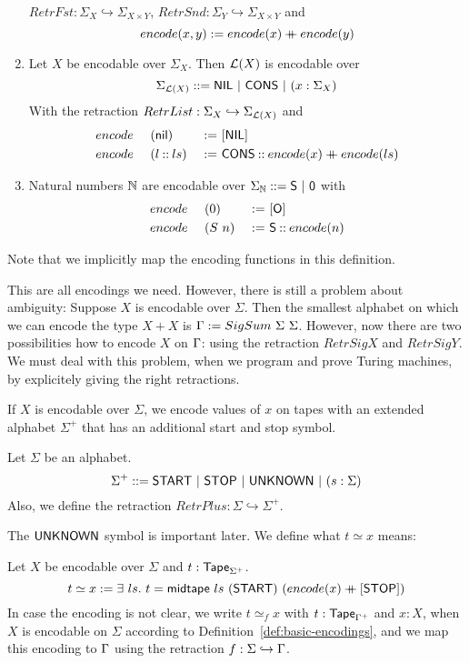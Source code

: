 \begin{definition}
\begin{enumerate}
    $RetrFst : \Sigma_X \hookrightarrow \Sigma_{X \times Y}$, $RetrSnd : \Sigma_Y \hookrightarrow \Sigma_{X \times Y}$ and
    \[
      encode(x,y) := encode(x) \mathbin{+\mkern-10mu+} encode(y)
    \]
  \item Let $X$ be encodable over $\Sigma_X$.  Then $\mathcal{L}(X)$ is encodable over
    \[ \Sigma_{\mathcal{L}(X)} ::= \mathsf{NIL} ~|~ \mathsf{CONS} ~|~ (x:\Sigma_X) \]
    With the retraction $RetrList : \Sigma_X \hookrightarrow \Sigma_{\mathcal{L}(X)}$ and
    \begin{alignat*}{3}
      &encode~&&(\mathsf{nil}      ) &~:=~& [\mathsf{NIL}] \\
      &encode~&&(l \mathbin{::} ls) &~:=~& \mathsf{CONS} \mathbin{::} encode(x) \mathbin{+\mkern-10mu+} encode(ls)
    \end{alignat*}
  \item Natural numbers $\mathbb{N}$ are encodable over $\Sigma_{\mathbb{N}} ::= \mathsf{S} ~|~ \mathsf{0} $ with
    \begin{alignat*}{3}
      &encode~&&(0  ) &~:=~& [\mathsf{O}] \\
      &encode~&&(S~n) &~:=~& \mathsf{S} \mathbin{::} encode(n)
    \end{alignat*}
  \end{enumerate}
  Note that we implicitly map the encoding functions in this definition.
\end{definition}

This are all encodings we need.  However, there is still a problem about ambiguity: Suppose $X$ is encodable over $\Sigma$.  Then the smallest
alphabet on which we can encode the type $X+X$ is $\Gamma := SigSum~\Sigma~\Sigma$.  However, now there are two possibilities how to encode $X$ on
$\Gamma$: using the retraction $RetrSigX$ and $RetrSigY$.  We must deal with this problem, when we program and prove Turing machines, by explicitely
giving the right retractions.

If $X$ is encodable over $\Sigma$, we encode values of $x$ on tapes with an extended alphabet $\Sigma^+$ that has an additional start and stop symbol.
\begin{definition}[$\Sigma^+$] Let $\Sigma$ be an alphabet.
  \[
    \Sigma^+ ::= \mathsf{START} ~|~ \mathsf{STOP} ~|~ \mathsf{UNKNOWN} ~|~ (s: \Sigma)
  \]
  Also, we define the retraction $RetrPlus : \Sigma \hookrightarrow \Sigma^+$.
\end{definition}
The $\mathsf{UNKNOWN}$ symbol is important later. We define what $t \simeq x$ means:
\begin{definition}[$t \simeq x$]
  \label{def:tape_contains}
  Let $X$ be encodable over $\Sigma$ and $t : \mathsf{Tape}_{\Sigma^+}$.
  \[
    t \simeq x := \exists~ls.~
    t = \mathsf{midtape}~ls~(\mathsf{START})~(encode(x) \mathbin{+\mkern-10mu+} [\mathsf{STOP}])
  \]
  In case the encoding is not clear, we write $t \simeq_{f} x$ with $t:\mathsf{Tape}_{\Gamma^+}$ and $x:X$, when $X$ is encodable on $\Sigma$ according to
  Definition~\ref{def:basic-encodings}, and we map this encoding to $\Gamma$ using the retraction $f: \Sigma \hookrightarrow \Gamma$.
\end{definition}


